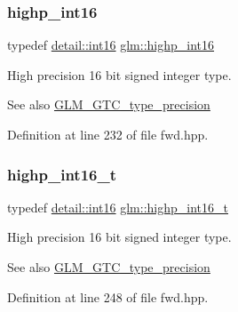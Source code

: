 \subsubsection{\texorpdfstring{highp\+\_\+int16}{highp\_int16}}
{\footnotesize\ttfamily typedef \hyperlink{namespaceglm_1_1detail_a375938874ca4f0a0982ec6373b56117b}{detail\+::int16} \hyperlink{group__gtc__type__precision_gaf0430ed80e88c0d1dfbe47f359659c81}{glm\+::highp\+\_\+int16}}

High precision 16 bit signed integer type. \begin{DoxySeeAlso}{See also}
\hyperlink{group__gtc__type__precision}{G\+L\+M\+\_\+\+G\+T\+C\+\_\+type\+\_\+precision} 
\end{DoxySeeAlso}


Definition at line 232 of file fwd.\+hpp.

\mbox{\label{group__gtc__type__precision_ga07d318d61472e75238e53b9642227672}} 
\subsubsection{\texorpdfstring{highp\+\_\+int16\+\_\+t}{highp\_int16\_t}}
{\footnotesize\ttfamily typedef \hyperlink{namespaceglm_1_1detail_a375938874ca4f0a0982ec6373b56117b}{detail\+::int16} \hyperlink{group__gtc__type__precision_ga07d318d61472e75238e53b9642227672}{glm\+::highp\+\_\+int16\+\_\+t}}

High precision 16 bit signed integer type. \begin{DoxySeeAlso}{See also}
\hyperlink{group__gtc__type__precision}{G\+L\+M\+\_\+\+G\+T\+C\+\_\+type\+\_\+precision} 
\end{DoxySeeAlso}


Definition at line 248 of file fwd.\+hpp.

\mbox{\label{group__gtc__type__precision_gaa2045c92b9553d463191af6a20e997bb}} 
